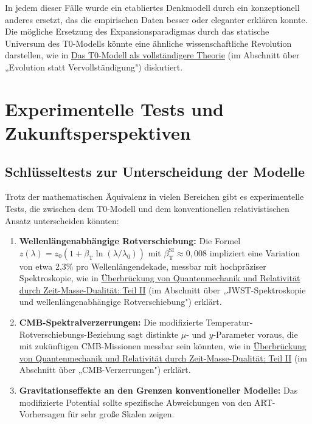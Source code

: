 \documentclass[12pt,a4paper]{article}
\newcommand{\betaT}{\beta_{\text{T}}}
\begin{document}
	In jedem dieser Fälle wurde ein etabliertes Denkmodell durch ein konzeptionell anderes ersetzt, das die empirischen Daten besser oder eleganter erklären konnte. Die mögliche Ersetzung des Expansionsparadigmas durch das statische Universum des T0-Modells könnte eine ähnliche wissenschaftliche Revolution darstellen, wie in \href{https://github.com/jpascher/T0-Time-Mass-Duality/tree/main/2/pdf/English/T0-ModelAsCompleteTheory_En.pdf}{Das T0-Modell als vollständigere Theorie} (im Abschnitt über „Evolution statt Vervollständigung") diskutiert.
	
	\section{Experimentelle Tests und Zukunftsperspektiven}
	\label{sec:experimental_tests}
	
	\subsection{Schlüsseltests zur Unterscheidung der Modelle}
	\label{subsec:key_tests}
	
	Trotz der mathematischen Äquivalenz in vielen Bereichen gibt es experimentelle Tests, die zwischen dem T0-Modell und dem konventionellen relativistischen Ansatz unterscheiden könnten:
	
	\begin{enumerate}
		\item \textbf{Wellenlängenabhängige Rotverschiebung:} Die Formel $z(\lambda) = z_0 (1 + \betaT \ln(\lambda/\lambda_0))$ mit $\betaT^{\text{SI}} \approx 0,008$ impliziert eine Variation von etwa 2,3\% pro Wellenlängendekade, messbar mit hochpräziser Spektroskopie, wie in \href{https://github.com/jpascher/T0-Time-Mass-Duality/tree/main/2/pdf/English/QMRelTimeMassPart2En.pdf}{Überbrückung von Quantenmechanik und Relativität durch Zeit-Masse-Dualität: Teil II} (im Abschnitt über „JWST-Spektroskopie und wellenlängenabhängige Rotverschiebung") erklärt.
		
		\item \textbf{CMB-Spektralverzerrungen:} Die modifizierte Temperatur-Rotverschiebungs-Beziehung sagt distinkte $\mu$- und $y$-Parameter voraus, die mit zukünftigen CMB-Missionen messbar sein könnten, wie in \href{https://github.com/jpascher/T0-Time-Mass-Duality/tree/main/2/pdf/English/QMRelTimeMassPart2En.pdf}{Überbrückung von Quantenmechanik und Relativität durch Zeit-Masse-Dualität: Teil II} (im Abschnitt über „CMB-Verzerrungen") erklärt.
		
		\item \textbf{Gravitationseffekte an den Grenzen konventioneller Modelle:} Das modifizierte Potential sollte spezifische Abweichungen von den ART-Vorhersagen für sehr große Skalen zeigen.
	\end{enumerate}
	
\end{document}
